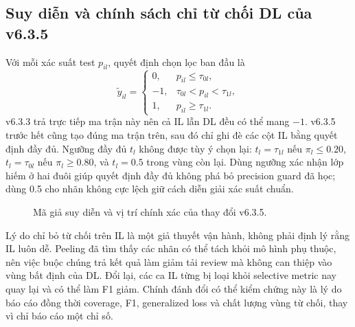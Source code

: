 \documentclass[11pt,a4paper,twoside]{article}
\begin{document}
\subsection{Suy diễn và chính sách chỉ từ chối DL của v6.3.5}
Với mỗi xác suất test $p_{il}$, quyết định chọn lọc ban đầu là
\begin{equation}\tilde y_{il}=\begin{cases}0,&p_{il}\le\tau_{0l},\\-1,&\tau_{0l}<p_{il}<\tau_{1l},\\1,&p_{il}\ge\tau_{1l}.\end{cases}\end{equation}
v6.3.3 trả trực tiếp ma trận này nên cả IL lẫn DL đều có thể mang $-1$. v6.3.5 trước hết cũng tạo đúng ma trận trên, sau đó chỉ ghi đè các cột IL bằng quyết định đầy đủ. Ngưỡng đầy đủ $t_l$ không được tùy ý chọn lại: $t_l=\tau_{1l}$ nếu $\pi_l\le0.20$, $t_l=\tau_{0l}$ nếu $\pi_l\ge0.80$, và $t_l=0.5$ trong vùng còn lại. Dùng ngưỡng xác nhận lớp hiếm ở hai đuôi giúp quyết định đầy đủ không phá bỏ precision guard đã học; dùng 0.5 cho nhãn không cực lệch giữ cách diễn giải xác suất chuẩn.
\begin{figure}[H]\centering
{}
\caption{Mã giả suy diễn và vị trí chính xác của thay đổi v6.3.5.}\label{alg:infer}
\end{figure}
Lý do chỉ bỏ từ chối trên IL là một giả thuyết vận hành, không phải định lý rằng IL luôn dễ. Peeling đã tìm thấy các nhãn có thể tách khỏi mô hình phụ thuộc, nên việc buộc chúng trả kết quả làm giảm tải review mà không can thiệp vào vùng bất định của DL. Đổi lại, các ca IL từng bị loại khỏi selective metric nay quay lại và có thể làm F1 giảm. Chính đánh đổi có thể kiểm chứng này là lý do báo cáo đồng thời coverage, F1, generalized loss và chất lượng vùng từ chối, thay vì chỉ báo cáo một chỉ số.
\end{document}
